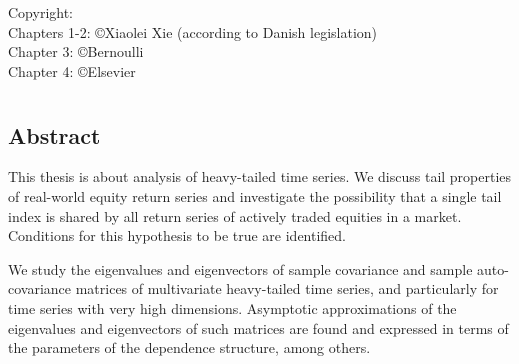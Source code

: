 \vspace*{5cm}
\noindent \hspace*{0.5cm} Copyright:\\
\hspace*{0.5cm} Chapters 1-2: \copyright Xiaolei Xie (according to Danish legislation)\\
\hspace*{0.5cm} Chapter 3: \copyright Bernoulli\\
\hspace*{0.5cm} Chapter 4: \copyright Elsevier\\


\begin{comment}
{	\pagestyle{empty}
	\setlength{\topmargin}{0pt}
	\setlength{\headheight}{0pt}
	\setlength{\headsep}{0pt}
	\setlength{\footskip}{0pt}
	
	\setlength{\parskip}{12pt}	
	
 \large \textbf{\textsc{Johannes Heiny}}
		
		\vspace*{1cm}
		
	
	\vspace*{\fill}}
\end{comment}


\chapter*{}
\vspace*{-2cm}
\section*{Abstract}

This thesis is about analysis of heavy-tailed time series. We discuss tail
properties of real-world equity return series and investigate the
possibility that a single tail index is shared by all return series of
actively traded equities in a market. Conditions for this hypothesis to
be true are identified.

We study the eigenvalues and eigenvectors of sample covariance and
sample auto-covariance matrices of multivariate heavy-tailed time series,
and particularly for time series with very high dimensions. Asymptotic
approximations of the eigenvalues and eigenvectors of such matrices
are found and expressed in terms of the parameters of the dependence
structure, among others.


